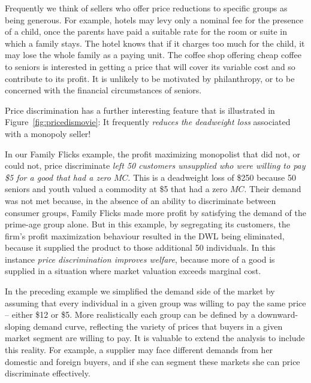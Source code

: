Frequently we think of sellers who offer price reductions to specific groups
as being generous. For example, hotels may levy only a nominal fee for the
presence of a child, once the parents have paid a suitable rate for the room
or suite in which a family stays. The hotel knows that if it charges too
much for the child, it may lose the whole family as a paying unit. The
coffee shop offering cheap coffee to seniors is interested in getting a
price that will cover its variable cost and so contribute to its profit. It
is unlikely to be motivated by philanthropy, or to be concerned with the
financial circumstances of seniors.

\newhtmlpage



Price discrimination has a further interesting feature that is illustrated
in Figure~\ref{fig:pricedismovie}: It frequently \textit{reduces the
deadweight loss} associated with a monopoly seller!
	
\newhtmlpage

In our Family Flicks example, the profit maximizing monopolist that did not,
or could not, price discriminate \textit{left 50 customers unsupplied who
	were willing to pay \$5 for a good that had a zero $MC$}. This is a
deadweight loss of \$250 because 50 seniors and youth valued a commodity at
\$5 that had a zero $MC$. Their demand was not met because, in the absence
of an ability to discriminate between consumer groups, Family Flicks made
more profit by satisfying the demand of the prime-age group alone. But in this
example, by segregating its customers, the firm's profit maximization
behaviour resulted in the DWL being eliminated, because it supplied the
product to those additional 50 individuals. In this instance \textit{price
	discrimination improves welfare}, because more of a good is supplied in a
situation where market valuation exceeds marginal cost.

In the preceding example we simplified the demand side of the market by
assuming that every individual in a given group was willing to pay the same
price -- either \$12 or \$5. More realistically each group can be defined by
a downward-sloping demand curve, reflecting the variety of prices that
buyers in a given market segment are willing to pay. It is valuable to
extend the analysis to include this reality. For example, a supplier may
face different demands from her domestic and foreign buyers, and if she can
segment these markets she can price discriminate effectively.

